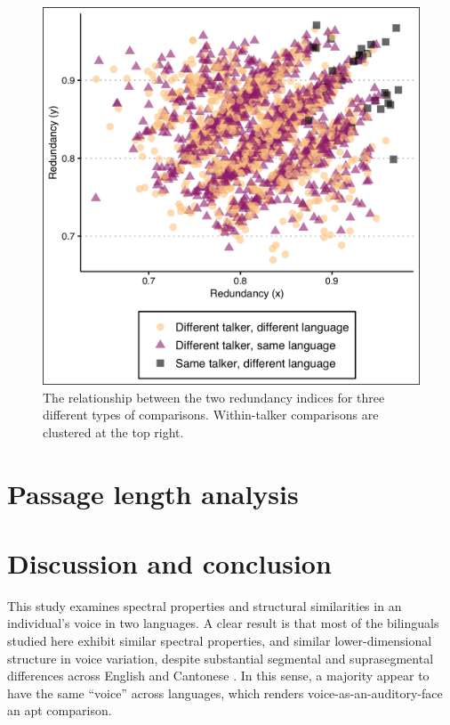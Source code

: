 \begin{figure}[htbp]
\begin{center}
\includegraphics[width=0.875\linewidth]{figures/ch3_redundancy.png} 
\caption{The relationship between the two redundancy indices for three different types of comparisons. Within-talker comparisons are clustered at the top right.}
\label{ch3:fig:redundancy}
\end{center}
\end{figure}


\section{Passage length analysis}\label{ch3:sec:passagelength}



\section{Discussion and conclusion}\label{ch3:sec:discussion}

This study examines spectral properties and structural similarities in an individual's voice in two languages. A clear result is that most of the bilinguals studied here exhibit similar spectral properties, and similar lower-dimensional structure in voice variation, despite substantial segmental and suprasegmental differences across English and Cantonese \citep{matthews_2013_cantonese}. In this sense, a majority appear to have the same ``voice'' across languages, which renders voice-as-an-auditory-face an apt comparison.

